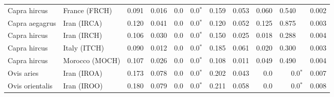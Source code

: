 \begin{center}
\begin{adjustbox}{width = 1\textwidth}
\begin{tabular}{|l|l|r|r|r|r|r|r|r|r|r|}
        Capra hircus &                   France (FRCH) &                 0.091 &                                0.016 &                  0.0 &                             0.0$\bm{^*}$ &                 0.159 &                                0.053 &                0.060 &                                  0.540~~ &              0.002 \\
      Capra aegagrus &                     Iran (IRCA) &                 0.120 &                                0.041 &                  0.0 &                             0.0$\bm{^*}$ &                 0.120 &                                0.052 &                0.125 &                                  0.875~~ &              0.003 \\
        Capra hircus &                     Iran (IRCH) &                 0.106 &                                0.030 &                  0.0 &                             0.0$\bm{^*}$ &                 0.150 &                                0.025 &                0.018 &                                  0.288~~ &              0.004 \\
        Capra hircus &                    Italy (ITCH) &                 0.090 &                                0.012 &                  0.0 &                             0.0$\bm{^*}$ &                 0.185 &                                0.061 &                0.020 &                                  0.300~~ &              0.003 \\
        Capra hircus &                  Morocco (MOCH) &                 0.107 &                                0.026 &                  0.0 &                             0.0$\bm{^*}$ &                 0.108 &                                0.011 &                0.049 &                                  0.490~~ &              0.004 \\
          Ovis aries &                     Iran (IROA) &                 0.173 &                                0.078 &                  0.0 &                             0.0$\bm{^*}$ &                 0.202 &                                0.043 &                  0.0 &                             0.0$\bm{^*}$ &              0.007 \\
     Ovis orientalis &                     Iran (IROO) &                 0.180 &                                0.079 &                  0.0 &                             0.0$\bm{^*}$ &                 0.211 &                                0.058 &                  0.0 &                             0.0$\bm{^*}$ &              0.008 \\

\end{tabular}
\end{adjustbox}
\end{center}
